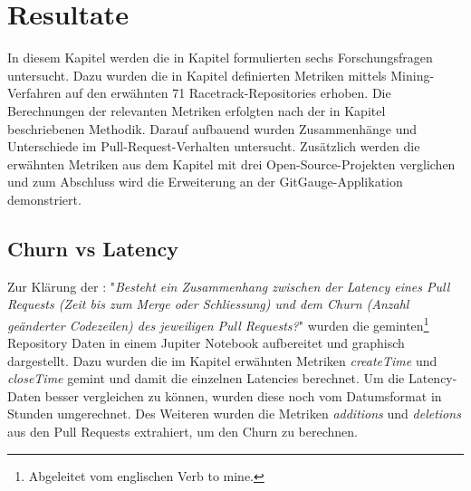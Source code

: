 


\chapter{Resultate} %

\label{Chapter4} %

In diesem Kapitel werden die in Kapitel  formulierten sechs Forschungsfragen untersucht. Dazu wurden die in Kapitel  definierten Metriken mittels Mining-Verfahren auf den erwähnten 71 Racetrack-Repositories erhoben. Die Berechnungen der relevanten Metriken erfolgten nach der in Kapitel  beschriebenen Methodik. Darauf aufbauend wurden Zusammenhänge und Unterschiede im Pull-Request-Verhalten untersucht. Zusätzlich werden die erwähnten Metriken aus dem Kapitel  mit drei Open-Source-Projekten verglichen und zum Abschluss wird die Erweiterung an der GitGauge-Applikation demonstriert. 


\section{Churn vs Latency}
\label{sec:ResultatChurnLatency}
Zur Klärung der : "\textit{Besteht ein Zusammenhang zwischen der Latency eines Pull
Requests (Zeit bis zum Merge oder Schliessung) und dem Churn (Anzahl geänderter Codezeilen) des jeweiligen Pull Requests?}" wurden die geminten\footnote{Abgeleitet vom englischen Verb to mine.} Repository Daten in einem Jupiter Notebook aufbereitet und graphisch dargestellt. Dazu wurden die im Kapitel  erwähnten Metriken \textit{createTime} und \textit{closeTime} gemint und damit die einzelnen Latencies berechnet. Um die Latency-Daten besser vergleichen zu können, wurden diese noch vom Datumsformat in Stunden umgerechnet. Des Weiteren wurden die Metriken  \textit{additions} und  \textit{deletions} aus den Pull Requests extrahiert, um den Churn zu berechnen.


